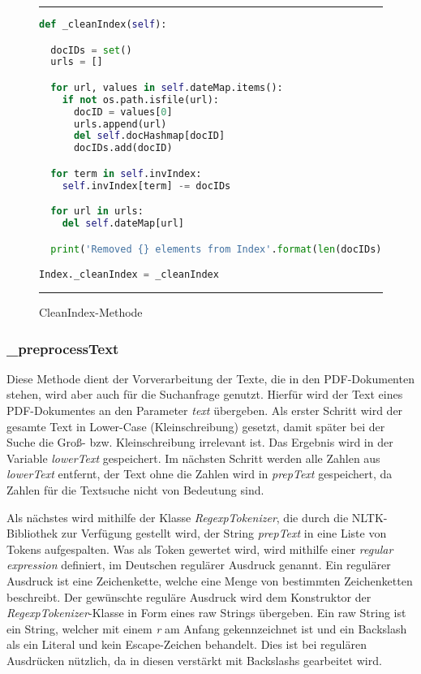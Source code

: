 \begin{figure}
	\rule{\textwidth}{0.4pt}
	\begin{lstlisting}[language=Python]
def _cleanIndex(self):

  docIDs = set()
  urls = []

  for url, values in self.dateMap.items():
    if not os.path.isfile(url):
      docID = values[0]
      urls.append(url)
      del self.docHashmap[docID]
      docIDs.add(docID)

  for term in self.invIndex:
    self.invIndex[term] -= docIDs

  for url in urls:
    del self.dateMap[url]

  print('Removed {} elements from Index'.format(len(docIDs)))

Index._cleanIndex = _cleanIndex

	\end{lstlisting}
	\rule{\textwidth}{0.4pt}
	\caption{CleanIndex-Methode}
	\label{fig:cleanIndex}
\end{figure}

\subsubsection{\_preprocessText}\label{preprocess}
Diese Methode dient der Vorverarbeitung der Texte, die in den PDF-Dokumenten stehen, wird aber auch für die Suchanfrage genutzt. Hierfür wird der Text eines PDF-Dokumentes an den Parameter \textit{text} übergeben. Als erster Schritt wird der gesamte Text in Lower-Case (Kleinschreibung) gesetzt, damit später bei der Suche die Groß- bzw. Kleinschreibung irrelevant ist. Das Ergebnis wird in der Variable \textit{lowerText} gespeichert. Im nächsten Schritt werden alle Zahlen aus \textit{lowerText} entfernt, der Text ohne die Zahlen wird in \textit{prepText} gespeichert, da Zahlen für die Textsuche nicht von Bedeutung sind.

Als nächstes wird mithilfe der Klasse \textit{RegexpTokenizer}, die durch die NLTK-Bibliothek zur Verfügung gestellt wird, der String \textit{prepText} in eine Liste von Tokens aufgespalten. Was als Token gewertet wird, wird mithilfe einer \textit{regular expression} definiert, im Deutschen regulärer Ausdruck genannt. Ein regulärer Ausdruck ist eine Zeichenkette, welche eine Menge von bestimmten Zeichenketten beschreibt. Der gewünschte reguläre Ausdruck wird dem Konstruktor der \textit{RegexpTokenizer}-Klasse in Form eines raw Strings übergeben. Ein raw String ist ein String, welcher mit einem \textit{r} am Anfang gekennzeichnet ist und ein Backslash als ein Literal und kein Escape-Zeichen behandelt. Dies ist bei regulären Ausdrücken nützlich, da in diesen verstärkt mit Backslashs gearbeitet wird.

